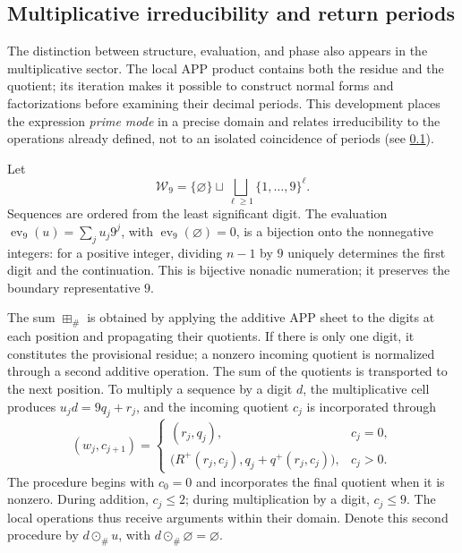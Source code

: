 \subsection{Multiplicative irreducibility and return periods}
\label{primos-retornos}

The distinction between structure, evaluation, and phase also appears in the
multiplicative sector. The local APP product contains both the residue
and the quotient; its iteration makes it possible to construct normal forms and
factorizations before examining their decimal periods. This development
places the expression \emph{prime mode} in a precise domain and relates
irreducibility to the operations already defined, not to an isolated
coincidence of periods (see \ref{primos-retornos}).

Let
\[
 \mathcal W_9=\{\varnothing\}\sqcup
 \bigsqcup_{\ell\geq1}\{1,\ldots,9\}^{\ell}.
\]
Sequences are ordered from the least significant digit. The evaluation
\(\operatorname{ev}_9(u)=\sum_j u_j9^j\), with
\(\operatorname{ev}_9(\varnothing)=0\), is a bijection onto the nonnegative
integers: for a positive integer, dividing \(n-1\) by \(9\)
uniquely determines the first digit and the continuation. This is
bijective nonadic numeration; it preserves the boundary representative
\(9\).

The sum \(\boxplus_\#\) is obtained by applying the additive APP sheet to the
digits at each position and propagating their quotients. If there is only one digit,
it constitutes the provisional residue; a nonzero incoming quotient is
normalized through a second additive operation. The sum of the
quotients is transported to the next position. To multiply a
sequence by a digit \(d\), the multiplicative cell produces
\(u_jd=9q_j+r_j\), and the incoming quotient \(c_j\) is incorporated through
\[
 (w_j,c_{j+1})=
 \begin{cases}
 (r_j,q_j),&c_j=0,\\
 \bigl(R^+(r_j,c_j),q_j+q^+(r_j,c_j)\bigr),&c_j>0.
 \end{cases}
\]
The procedure begins with \(c_0=0\) and incorporates the final quotient when it is
nonzero. During addition, \(c_j\leq2\); during multiplication by a digit,
\(c_j\leq9\). The local operations thus receive arguments within
their domain. Denote this second procedure by \(d\odot_\#u\),
with \(d\odot_\#\varnothing=\varnothing\).

